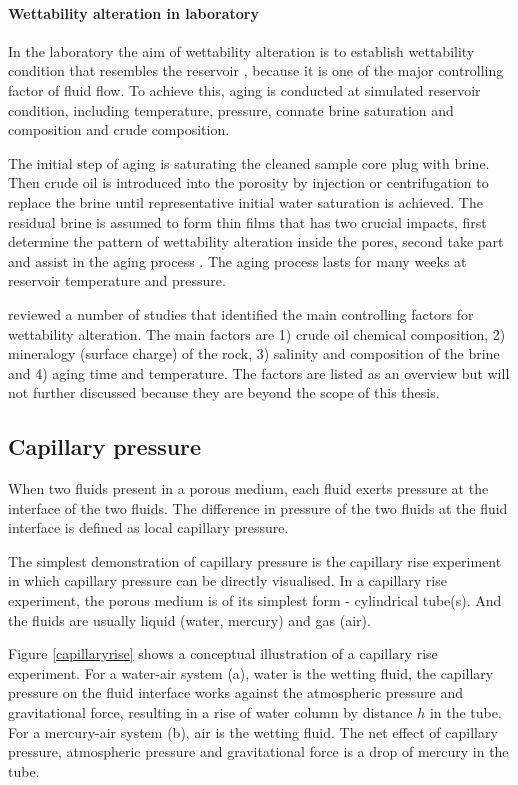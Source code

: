 \paragraph{Wettability alteration in laboratory}
In the laboratory the aim of wettability alteration is to establish wettability condition that resembles the reservoir \citep{al2005wettability}, because it is one of the major controlling factor of fluid flow. To achieve this, aging is conducted at simulated reservoir condition, including temperature, pressure, connate brine saturation and composition and crude composition. 

The initial step of aging is saturating the cleaned sample core plug with brine. Then crude oil is introduced into the porosity by injection or centrifugation to replace the brine until representative initial water saturation is achieved. The residual brine is assumed to form thin films that has two crucial impacts, first determine the pattern of wettability alteration inside the pores, second take part and assist in the aging process \citep{buckley1996mechanisms}. The aging process lasts for many weeks at reservoir temperature and pressure.

\citet{Pak2014thesis} reviewed a number of studies that identified the main controlling factors for wettability alteration. The main factors are 1) crude oil chemical composition, 2) mineralogy (surface charge) of the rock, 3) salinity and composition of the brine and 4) aging time and temperature. The factors are listed as an overview but will not further discussed because they are beyond the scope of this thesis.


\subsection{Capillary pressure}
When two fluids present in a porous medium, each fluid exerts pressure at the interface of the two fluids. The difference in pressure of the two fluids at the fluid interface is defined as local capillary pressure.

The simplest demonstration of capillary pressure is the capillary rise experiment \citep{young1805iii,leverett1941capillary} in which capillary pressure can be directly visualised. In a capillary rise experiment, the porous medium is of its simplest form - cylindrical tube(s). And the fluids are usually liquid (water, mercury) and gas (air).

Figure \ref{capillaryrise} shows a conceptual illustration of a capillary rise experiment. For a water-air system (a), water is the wetting fluid, the capillary pressure on the fluid interface works against the atmospheric pressure and gravitational force, resulting in a rise of water column by distance $h$ in the tube. For a mercury-air system (b), air is the wetting fluid. The net effect of capillary pressure, atmospheric pressure and gravitational force is a drop of mercury in the tube. 

